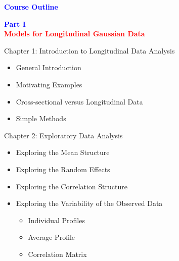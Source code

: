 \documentclass{beamer}
\begin{document}
\begin{frame}
\centering
\Large
\textbf{\textcolor{blue} {Course Outline}}\\
\vspace*{3mm}
\end{frame}

\begin{frame}
\centering
\Large
\textbf{\textcolor{blue} {Part I}}\\
\vspace*{3mm}
\textbf{\textcolor{red} {Models for Longitudinal Gaussian Data}}\\
\end{frame}

\begin{frame}{Chapter 1: Introduction to Longitudinal Data Analysis}
\begin{itemize}
\item General Introduction \vspace{0.5cm}
\item Motivating Examples \vspace{0.5cm}
\item Cross-sectional versus Longitudinal Data \vspace{0.5cm}
\item Simple Methods \vspace{0.5cm}
\end{itemize}
\end{frame}

\begin{frame}{Chapter 2: Exploratory Data Analysis}
\begin{itemize}
\item Exploring the Mean Structure  \vspace{0.5cm}
\item Exploring the Random Effects \vspace{0.5cm}
\item Exploring the Correlation Structure \vspace{0.5cm}
\item Exploring the Variability of the Observed Data \vspace{0.5cm}
	\begin{itemize}
	\item Individual Profiles  \vspace{0.5cm}
	\item Average Profile  \vspace{0.5cm}
	\item Correlation Matrix  \vspace{0.5cm}
   \end{itemize}
\end{itemize}
\end{frame}
\end{document}
